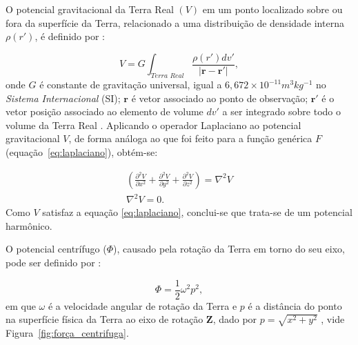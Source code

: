 O potencial gravitacional  da Terra Real $(V)$ em um ponto localizado sobre ou fora da superfície da Terra, relacionado a uma distribuição de densidade interna $\rho(r')$, é definido por \cite{heiskanen1967, hofmann2005}:

\begin{equation} \label{eq:integral_potencial_gravitacional}
\displaystyle {V = G \int_{Terra\,\,Real} \frac{\rho(r') dv'}{| \mathbf{r} - \mathbf{r'} |}},
\end{equation} onde $G$ é constante de gravitação universal, igual a $6,672 \times 10^{-11} m^{3}kg^{-1}$ no \textit{Sistema Internacional} (SI); $\mathbf{r}$ é vetor associado ao ponto de observação; $\mathbf{r'}$ é o vetor posição associado ao elemento de volume $dv'$ a ser integrado sobre todo o volume da Terra Real \cite{escobar2000}. Aplicando o operador Laplaciano ao potencial gravitacional $V$, de forma análoga ao que foi feito para a função genérica $F$ (equação~\ref{eq:laplaciano}), obtém-se:

\begin{equation} \label{eq:harmonico_V}
\begin{gathered}
\displaystyle {\left( \frac{\partial^{2} V}{\partial x^{2}}+\frac{\partial^{2} V}{\partial y^{2}}+\frac{\partial^{2} V}{\partial z^{2}}\right) = \nabla^{2}V} \\
\displaystyle {\nabla^{2}V = 0}.
\end{gathered}
\end{equation} Como $V$ satisfaz a equação \ref{eq:laplaciano}, conclui-se que trata-se de um potencial harmônico.

O potencial centrífugo ($\Phi$), causado pela rotação da Terra em torno do seu eixo, pode ser definido por \cite{torge2001geodesy,hofmann2005}:

\begin{equation} \label{eq:integral_potencial_centrifugo}
\displaystyle {\Phi =\frac{1}{2} \omega^{2} p^{2}},
\end{equation} em que $\omega$ é a velocidade angular de rotação da Terra e $p$ é a distância do ponto na superfície física da Terra ao eixo de rotação $\mathbf{Z}$, dado por $p=\sqrt{x^{2}+y^{2}}$ \cite{arana2009}, vide Figura~\ref{fig:força_centrifuga}.

